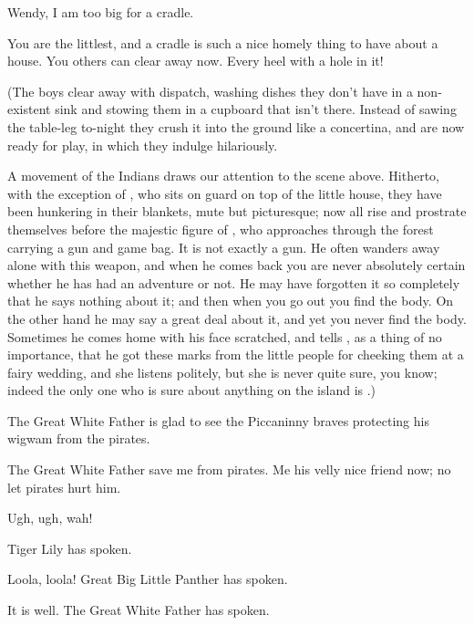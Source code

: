 \begin{drama}
\michaelspeaks
Wendy, I am too big for a cradle.

\wendyspeaks
You are the littlest, and a cradle is such a nice homely thing to have about a house.
You others can clear away now.
Every heel with a hole in it!

\begin{stagedir}
(The boys clear away with dispatch,
washing dishes they don't have in a non-existent sink and stowing them in a cupboard that isn't there.
Instead of sawing the table-leg to-night they crush it into the ground like a concertina,
and are now ready for play, in which they indulge hilariously.

A movement of the Indians draws our attention to the scene above.
Hitherto, with the exception of \panther, who sits on guard on top of the little house,
they have been hunkering in their blankets, mute but picturesque;
now all rise and prostrate themselves before the majestic figure of \peter,
who approaches through the forest carrying a gun and game bag.
It is not exactly a gun.
He often wanders away alone with this weapon,
and when he comes back you are never absolutely certain whether he has had an adventure or not.
He may have forgotten it so completely that he says nothing about it;
and then when you go out you find the body.
On the other hand he may say a great deal about it, and yet you never find the body.
Sometimes he comes home with his face scratched,
and tells \wendy, as a thing of no importance,
that he got these marks from the little people for cheeking them at a fairy wedding,
and she listens politely, but she is never quite sure, you know;
indeed the only one who is sure about anything on the island is \peter.)
\end{stagedir}

\peterspeaks
The Great White Father is glad to see the Piccaninny braves protecting his wigwam from the pirates.

\tigerlilyspeaks
The Great White Father save me from pirates.
Me his velly nice friend now;
no let pirates hurt him.

Ugh, ugh, wah!

\tigerlilyspeaks
Tiger Lily has spoken.

\pantherspeaks
Loola, loola!
Great Big Little Panther has spoken.

\peterspeaks
It is well.
The Great White Father has spoken.



\end{drama}
